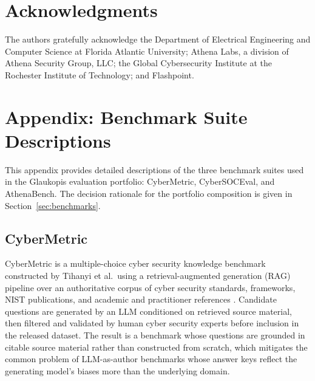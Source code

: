 \documentclass[webpdf,contemporary,large]{oup-authoring-template}
\theoremstyle{thmstyleone}
\theoremstyle{thmstyletwo}
\theoremstyle{thmstylethree}
\begin{document}
\section{Acknowledgments}
The authors gratefully acknowledge the Department of Electrical Engineering and Computer Science at Florida Atlantic University; Athena Labs, a division of Athena Security Group, LLC; the Global Cybersecurity Institute at the Rochester Institute of Technology; and Flashpoint.



\setcounter{section}{0}
\renewcommand{\thesection}{\Alph{section}}
\section{Appendix: Benchmark Suite Descriptions}
\label{app:benchmarks}

This appendix provides detailed descriptions of the three benchmark suites used in the Glaukopis evaluation portfolio: CyberMetric, CyberSOCEval, and AthenaBench. The decision rationale for the portfolio composition is given in Section~\ref{sec:benchmarks}.

\subsection{CyberMetric}
\label{sec:cybermetric}

CyberMetric is a multiple-choice cyber security knowledge benchmark constructed by Tihanyi et al.\ using a retrieval-augmented generation (RAG) pipeline over an authoritative corpus of cyber security standards, frameworks, NIST publications, and academic and practitioner references \cite{tihanyi2024cybermetric}. Candidate questions are generated by an LLM conditioned on retrieved source material, then filtered and validated by human cyber security experts before inclusion in the released dataset. The result is a benchmark whose questions are grounded in citable source material rather than constructed from scratch, which mitigates the common problem of LLM-as-author benchmarks whose answer keys reflect the generating model's biases more than the underlying domain.
\end{document}
